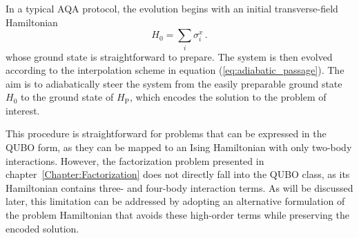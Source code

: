 In a typical AQA protocol, the evolution begins with an initial transverse-field Hamiltonian
\begin{equation}
    H_0 = \sum_i \sigma_i^x\,.
    \label{eq:transverse_field_hamiltonian}
\end{equation}
whose ground state is straightforward to prepare. The system is then evolved according to the interpolation
scheme in equation (\ref{eq:adiabatic_passage}). The aim is to adiabatically steer the system from the easily
preparable ground state $H_0$ to the ground state of $H_\mathrm{P}$, which encodes the solution to the
problem of interest.

This procedure is straightforward for problems that can be expressed in the QUBO form, as they can be mapped to
an Ising Hamiltonian with only two-body interactions. However, the factorization problem presented in
chapter~\ref{Chapter:Factorization} does not directly fall into the QUBO class, as its Hamiltonian contains
three- and four-body interaction terms. As will be discussed later, this limitation can be addressed by adopting
an alternative formulation of the problem Hamiltonian that avoids these high-order terms while preserving the encoded solution.